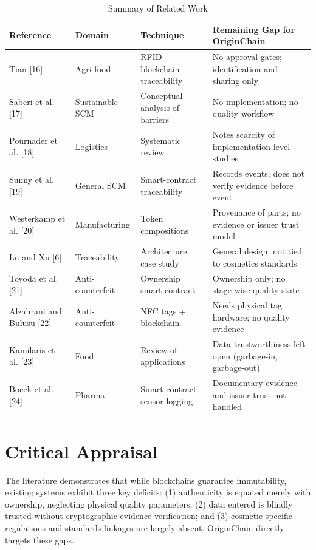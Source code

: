 \documentclass[12pt,a4paper]{report}
\begin{document}
\begin{table}[H]
\centering
\caption{Summary of Related Work}
\label{tab:lit_survey}
\small
\begin{tabularx}{\textwidth}{p{2.8cm} p{2.2cm} p{3.5cm} X}
\toprule
\textbf{Reference} & \textbf{Domain} & \textbf{Technique} & \textbf{Remaining Gap for OriginChain} \\
\midrule
Tian [16] & Agri-food & RFID + blockchain traceability & No approval gates; identification and sharing only \\
Saberi et al. [17] & Sustainable SCM & Conceptual analysis of barriers & No implementation; no quality workflow \\
Pournader et al. [18] & Logistics & Systematic review & Notes scarcity of implementation-level studies \\
Sunny et al. [19] & General SCM & Smart-contract traceability & Records events; does not verify evidence before event \\
Westerkamp et al. [20] & Manufacturing & Token compositions & Provenance of parts; no evidence or issuer trust model \\
Lu and Xu [6] & Traceability & Architecture case study & General design; not tied to cosmetics standards \\
Toyoda et al. [21] & Anti-counterfeit & Ownership smart contract & Ownership only; no stage-wise quality state \\
Alzahrani and Bulusu [22] & Anti-counterfeit & NFC tags + blockchain & Needs physical tag hardware; no quality evidence \\
Kamilaris et al. [23] & Food & Review of applications & Data trustworthiness left open (garbage-in, garbage-out) \\
Bocek et al. [24] & Pharma & Smart contract sensor logging & Documentary evidence and issuer trust not handled \\
\bottomrule
\end{tabularx}
\end{table}

\section{Critical Appraisal}
The literature demonstrates that while blockchains guarantee immutability, existing systems exhibit three key deficits: (1) authenticity is equated merely with ownership, neglecting physical quality parameters; (2) data entered is blindly trusted without cryptographic evidence verification; and (3) cosmetic-specific regulations and standards linkages are largely absent. OriginChain directly targets these gaps.
\end{document}
